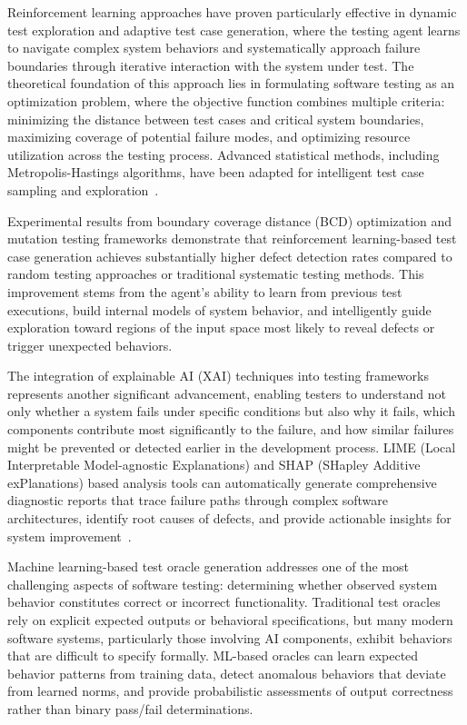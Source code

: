 \documentclass[manuscript,screen,review]{acmart}
\begin{document}
Reinforcement learning approaches have proven particularly effective in dynamic test exploration and adaptive test case generation, where the testing agent learns to navigate complex system behaviors and systematically approach failure boundaries through iterative interaction with the system under test. The theoretical foundation of this approach lies in formulating software testing as an optimization problem, where the objective function combines multiple criteria: minimizing the distance between test cases and critical system boundaries, maximizing coverage of potential failure modes, and optimizing resource utilization across the testing process. Advanced statistical methods, including Metropolis-Hastings algorithms, have been adapted for intelligent test case sampling and exploration~\cite{Chib1995}.

Experimental results from boundary coverage distance (BCD) optimization and mutation testing frameworks demonstrate that reinforcement learning-based test case generation achieves substantially higher defect detection rates compared to random testing approaches or traditional systematic testing methods. This improvement stems from the agent's ability to learn from previous test executions, build internal models of system behavior, and intelligently guide exploration toward regions of the input space most likely to reveal defects or trigger unexpected behaviors.

The integration of explainable AI (XAI) techniques into testing frameworks represents another significant advancement, enabling testers to understand not only whether a system fails under specific conditions but also why it fails, which components contribute most significantly to the failure, and how similar failures might be prevented or detected earlier in the development process. LIME (Local Interpretable Model-agnostic Explanations) and SHAP (SHapley Additive exPlanations) based analysis tools can automatically generate comprehensive diagnostic reports that trace failure paths through complex software architectures, identify root causes of defects, and provide actionable insights for system improvement~\cite{Ribeiro2016,Lundberg2017}.

Machine learning-based test oracle generation addresses one of the most challenging aspects of software testing: determining whether observed system behavior constitutes correct or incorrect functionality. Traditional test oracles rely on explicit expected outputs or behavioral specifications, but many modern software systems, particularly those involving AI components, exhibit behaviors that are difficult to specify formally. ML-based oracles can learn expected behavior patterns from training data, detect anomalous behaviors that deviate from learned norms, and provide probabilistic assessments of output correctness rather than binary pass/fail determinations.
\end{document}
